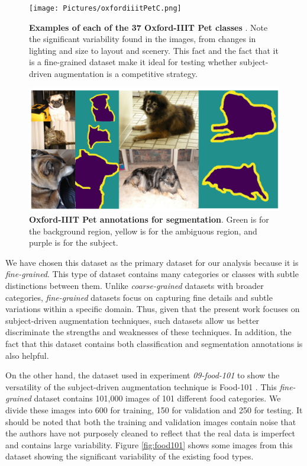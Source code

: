 \begin{figure}
    \centering
    \texttt{[image: Pictures/oxfordiiitPetC.png]} 
    \caption{\textbf{Examples of each of the 37 Oxford-IIIT Pet classes} \cite{Parkhi2012CatsAD}. Note the significant variability found in the images, from changes in lighting and size to layout and scenery. This fact and the fact that it is a fine-grained dataset make it ideal for testing whether subject-driven augmentation is a competitive strategy.}
    \label{fig:oxfordiiitPetC}
\end{figure}

\begin{figure}
    \centering
    \includegraphics[width=1\textwidth]{Pictures/oxfordiiitPetS.png} 
    \caption{\textbf{Oxford-IIIT Pet annotations for segmentation}. Green is for the background region, yellow is for the ambiguous region, and purple is for the subject. }
    \label{fig:oxfordiiitPetS}
\end{figure}

We have chosen this dataset as the primary dataset for our analysis because it is \textit{fine-grained}. This type of dataset contains many categories or classes with subtle distinctions between them. Unlike \textit{coarse-grained} datasets with broader categories, \textit{fine-grained} datasets focus on capturing fine details and subtle variations within a specific domain. Thus, given that the present work focuses on subject-driven augmentation techniques, such datasets allow us better discriminate the strengths and weaknesses of these techniques. In addition, the fact that this dataset contains both classification and segmentation annotations is also helpful.

On the other hand, the dataset used in experiment \textit{09-food-101} to show the versatility of the subject-driven augmentation technique is Food-101 \cite{bossard14}. This \textit{fine-grained} dataset contains 101,000 images of 101 different food categories. We divide these images into 600 for training, 150 for validation and 250 for testing. It should be noted that both the training and validation images contain noise that the authors have not purposely cleaned to reflect that the real data is imperfect and contains large variability. Figure \ref{fig:food101} shows some images from this dataset showing the significant variability of the existing food types.

